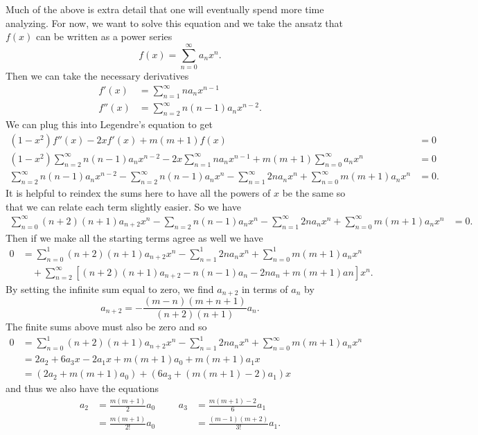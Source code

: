 Much of the above is extra detail that one will eventually spend more time analyzing. For now, we want to solve this equation and we take the ansatz that $f(x)$ can be written as a power series
\[
f(x)=\sum_{n=0}^\infty a_n x^n.
\]
Then we can take the necessary derivatives
\begin{align*}
    f'(x)&=\sum_{n=1}^\infty na_n x^{n-1}\\
    f''(x)&= \sum_{n=2}^\infty n(n-1) a_n x^{n-2}.
\end{align*}
We can plug this into Legendre's equation to get
\begin{align*}
    (1-x^2)f''(x)-2xf'(x)+m(m+1)f(x)&=0\\
    (1-x^2)\sum_{n=2}^\infty n(n-1)a_n x^{n-2} - 2x \sum_{n=1}^\infty na_n x^{n-1} +m(m+1) \sum_{n=0}^\infty a_n x^n &=0\\
    \sum_{n=2}^\infty n(n-1) a_n x^{n-2} - \sum_{n=2}^\infty n(n-1)a_n x^n -\sum_{n=1}^\infty 2n a_n x^{n}+\sum_{n=0}^\infty m(m+1)a_n x^n &=0. 
\end{align*}
It is helpful to reindex the sums here to have all the powers of $x$ be the same so that we can relate each term slightly easier. So we have
\begin{align*}
    \sum_{n=0}^\infty (n+2)(n+1) a_{n+2} x^n - \sum_{n=2} n(n-1) a_n x^n - \sum_{n=1}^\infty 2na_n x^n +\sum_{n=0}^\infty m(m+1)a_n x^n &=0.
\end{align*}
Then if we make all the starting terms agree as well we have
\begin{align*}
    0&= \sum_{n=0}^1 (n+2)(n+1)a_{n+2}x^n -\sum_{n=1}^1 2na_n x^n +\sum_{n=0}^1
    m(m+1)a_n x^n\\
    &\quad + \sum_{n=2}^\infty \left[ (n+2)(n+1)a_{n+2}-n(n-1)a_n -2na_n +m(m+1)an\right]x^n.
\end{align*}
By setting the infinite sum equal to zero, we find $a_{n+2}$ in terms of $a_n$ by
\[
a_{n+2} = -\frac{(m-n)(m+n+1)}{(n+2)(n+1)}a_n.
\]
The finite sums above must also be zero and so
\begin{align*}
    0&= \sum_{n=0}^1 (n+2)(n+1)a_{n+2}x^n -\sum_{n=1}^1 2na_n x^n + \sum_{n=0}^\infty m(m+1)a_n x^n \\
    &= 2a_2 + 6a_3 x - 2a_1 x + m(m+1)a_0 + m(m+1) a_1 x\\
    &= (2a_2 +m(m+1)a_0)+(6a_3+(m(m+1)-2)a_1)x
\end{align*}
and thus we also have the equations
\begin{align*}
    a_2 &= \frac{m(m+1)}{2}a_0 &&& a_3 &= \frac{m(m+1)-2}{6}a_1\\
        &= \frac{m(m+1)}{2!} a_0 &&&  &= \frac{(m-1)(m+2)}{3!}a_1.
\end{align*}

